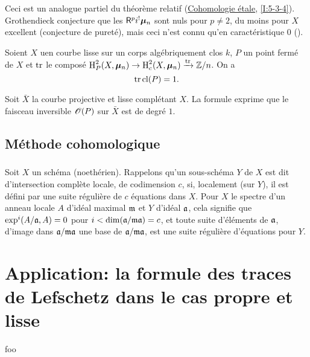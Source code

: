 Ceci est un analogue partiel du th\'eor\`eme relatif 
(\hyperref[I]{Cohomologie \'etale}, \ref{I:5-3-4}). Grothendieck conjecture 
que les $\mathsf{R}^p i^! {\bm\mu}_n$ sont nuls pour $p\ne 2$, du moins pour $X$ excellent 
(conjecture de puret\'e), mais ceci n'est connu qu'en caract\'eristique $0$ 
(\cite[XIX]{sga4}). 




\begin{theorem}\label{IV:2-1-5}
Soient $X$ uen courbe lisse sur un corps alg\'ebriquement clos $k$, $P$ un 
point ferm\'e de $X$ et $\operatorname{tr}$ le compos\'e $\operatorname{H}_P^2(X,{\bm\mu}_n) \to \operatorname{H}_c^2(X,{\bm\mu}_n) \xrightarrow{\operatorname{tr}} \mathbb{Z}/n$. On a 
\[
  \operatorname{tr} \operatorname{cl}(P) = 1 \text{.}
\]
\end{theorem}

Soit $\bar X$ la courbe projective et lisse compl\'etant $X$. La formule 
exprime que le faisceau inversible $\mathscr{O}(P)$ sur $\bar X$ est de degr\'e $1$. 










\subsection{M\'ethode cohomologique}\label{IV:2-2}





\subsubsection{}\label{IV:2-2-1}

Soit $X$ un sch\'ema (noeth\'erien). Rappelons qu'un sous-sch\'ema $Y$ de $X$ 
est dit d'intersection compl\`ete locale, de codimension $c$, si, localement 
(sur $Y$), il est d\'efini par une suite r\'eguli\`ere de $c$ \'equations dans 
$X$. Pour $X$ le spectre d'un anneau locale $A$ d'id\'eal maximal $\mathfrak{m}$ et 
$Y$ d'id\'eal $\mathfrak{a}$, cela signifie que $\exp^i(A/\mathfrak{a},A) = 0$ pour 
$i<\dim(\mathfrak{a}/\mathfrak{m}\mathfrak{a})=c$, et toute suite d'\'el\'ements de $\mathfrak{a}$, d'image dans 
$\mathfrak{a}/\mathfrak{m}\mathfrak{a}$ une base de $\mathfrak{a}/\mathfrak{m}\mathfrak{a}$, est une suite r\'eguli\`ere 
d'\'equations pour $Y$. 










\section{Application: la formule des traces de Lefschetz dans le cas propre et lisse}\label{IV:3}

\begin{corollary_}\label{IV:3-7}
foo
\end{corollary_}